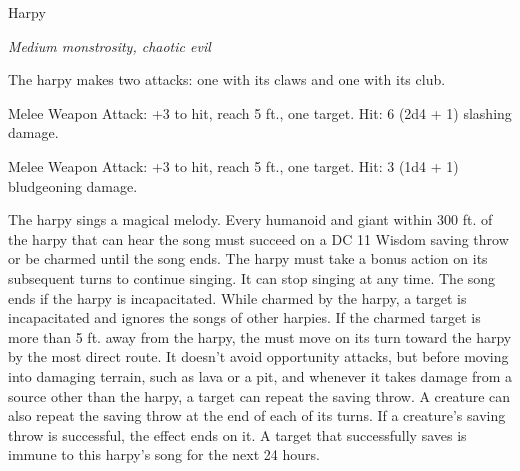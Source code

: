 \begin{monsterbox}{Harpy}
\begin{hangingpar}
\textit{Medium monstrosity, chaotic evil}
\end{hangingpar}
\dndline%
\basics[%
armorclass = 11,
hitpoints = 7d8 + 7,
speed = {20 ft., fly 40 ft.}
]
\dndline%
\stats[%
STR = \stat{12},
DEX = \stat{13},
CON = \stat{12},
INT = \stat{7},
WIS = \stat{10},
CHA = \stat{13}
]
\dndline%
\details[%
skills={},
damageimmunities={},
savingthrows={},
conditionimmunities={},
damageresistances={},
damagevulnerabilities={},
senses={passive Perception 10},
languages={Common},
challenge=1
]
\dndline%
\begin{monsteraction}[Multiattack]
The harpy makes two attacks: one with its claws and one with its club.
\end{monsteraction}
\begin{monsteraction}[Claws]
Melee Weapon Attack: +3 to hit, reach 5 ft., one target. Hit: 6 (2d4 + 1) slashing damage.
\end{monsteraction}
\begin{monsteraction}[Club]
Melee Weapon Attack: +3 to hit, reach 5 ft., one target. Hit: 3 (1d4 + 1) bludgeoning damage.
\end{monsteraction}
\begin{monsteraction}
The harpy sings a magical melody. Every humanoid and giant within 300 ft. of the harpy that can hear the song must succeed on a DC 11 Wisdom saving throw or be charmed until the song ends. The harpy must take a bonus action on its subsequent turns to continue singing. It can stop singing at any time. The song ends if the harpy is incapacitated.
While charmed by the harpy, a target is incapacitated and ignores the songs of other harpies. If the charmed target is more than 5 ft. away from the harpy, the must move on its turn toward the harpy by the most direct route. It doesn't avoid opportunity attacks, but before moving into damaging terrain, such as lava or a pit, and whenever it takes damage from a source other than the harpy, a target can repeat the saving throw. A creature can also repeat the saving throw at the end of each of its turns. If a creature's saving throw is successful, the effect ends on it.
A target that successfully saves is immune to this harpy's song for the next 24 hours.
\end{monsteraction}
\end{monsterbox}